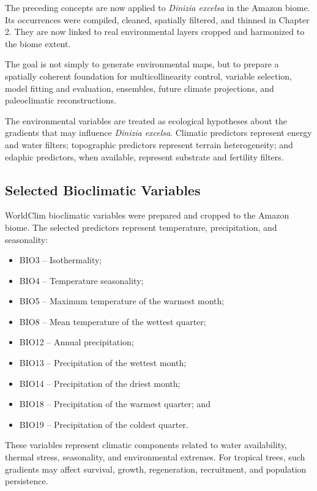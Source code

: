 The preceding concepts are now applied to \textit{Dinizia excelsa} in the
Amazon biome. Its occurrences were compiled, cleaned, spatially filtered, and
thinned in Chapter 2. They are now linked to real environmental layers cropped
and harmonized to the biome extent.

The goal is not simply to generate environmental maps, but to prepare a
spatially coherent foundation for multicollinearity control, variable selection,
model fitting and evaluation, ensembles, future climate projections, and
paleoclimatic reconstructions.

\begin{aplicacao}
The environmental variables are treated as ecological hypotheses about the
gradients that may influence \textit{Dinizia excelsa}. Climatic predictors
represent energy and water filters; topographic predictors represent terrain
heterogeneity; and edaphic predictors, when available, represent substrate and
fertility filters.
\end{aplicacao}

\subsection{Selected Bioclimatic Variables}

WorldClim bioclimatic variables were prepared and cropped to the Amazon biome.
The selected predictors represent temperature, precipitation, and seasonality:

\begin{itemize}
  \item BIO3 -- Isothermality;
  \item BIO4 -- Temperature seasonality;
  \item BIO5 -- Maximum temperature of the warmest month;
  \item BIO8 -- Mean temperature of the wettest quarter;
  \item BIO12 -- Annual precipitation;
  \item BIO13 -- Precipitation of the wettest month;
  \item BIO14 -- Precipitation of the driest month;
  \item BIO18 -- Precipitation of the warmest quarter; and
  \item BIO19 -- Precipitation of the coldest quarter.
\end{itemize}

These variables represent climatic components related to water availability,
thermal stress, seasonality, and environmental extremes. For tropical trees,
such gradients may affect survival, growth, regeneration, recruitment, and
population persistence.

